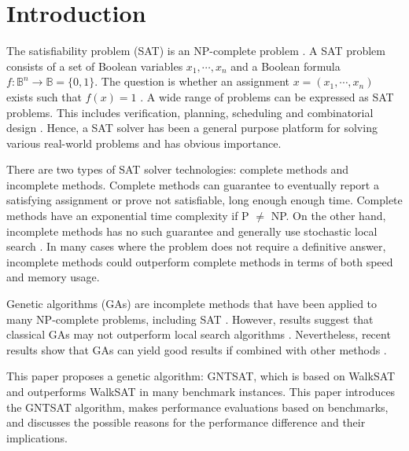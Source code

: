 \section{Introduction}
The satisfiability problem (SAT) is an NP-complete problem
\parencite{cook_1971}. A SAT problem consists of a set of Boolean variables
$x_1, \cdots, x_n$ and a Boolean formula $f: \mathbb{B}^n \rightarrow \mathbb{B}=\{0, 1\}$. The
question is whether an assignment $x=(x_1, \cdots, x_n)$ exists such that
$f(x)=1$ \parencite{gottlieb_marchiori_rossi_2002}. A wide range of problems can be
expressed as SAT problems. This includes verification, planning, scheduling
and combinatorial design \parencite{biere2009handbook}. Hence, a SAT solver has been a
general purpose platform for solving various real-world problems and has
obvious importance.

There are two types of SAT solver technologies: complete methods and
incomplete methods. Complete methods can guarantee to eventually report a
satisfying assignment or prove not satisfiable, long enough enough time.
Complete methods have an exponential time complexity if P
$\neq$ NP. On the other hand, incomplete methods has no such
guarantee and generally use stochastic local search \parencite{gomes_kautz_sabharwal_selman_2008}. In
many cases where the problem does not require a definitive answer, incomplete
methods could outperform complete methods in terms of both speed and memory
usage.

Genetic algorithms (GAs) are incomplete methods that have been applied to many
NP-complete problems, including SAT \parencite{gottlieb_marchiori_rossi_2002}. However, results
suggest that classical GAs may not outperform local search algorithms
\parencite{de1989using}. Nevertheless, recent results show that GAs can yield
good results if combined with other methods \parencite{gottlieb_marchiori_rossi_2002}.

This paper proposes a genetic algorithm: GNTSAT, which is based on WalkSAT
\parencite{selman1994noise} and outperforms WalkSAT in many benchmark instances.
This paper introduces the GNTSAT algorithm, makes performance evaluations
based on benchmarks, and discusses the possible reasons for the performance
difference and their implications.
